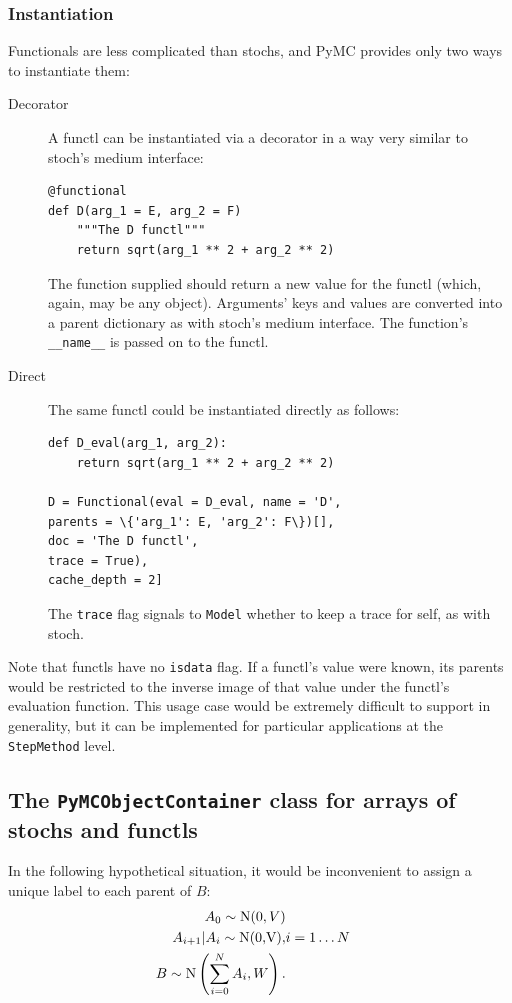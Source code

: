 \documentclass[]{book}
\begin{document}
\subsubsection{Instantiation}
Functionals are less complicated than stochs, and PyMC provides only two ways to instantiate them:
\begin{description}
    \item[Decorator] A functl can be instantiated via a decorator in a way very similar to stoch's medium interface:
\begin{verbatim}
@functional
def D(arg_1 = E, arg_2 = F)
    """The D functl"""
    return sqrt(arg_1 ** 2 + arg_2 ** 2)
\end{verbatim}
The function supplied should return a new value for the functl (which, again, may be any object). Arguments' keys and values are converted into a parent dictionary as with stoch's medium interface. The function's \texttt{\_\_name\_\_} is passed on to the functl.
    \item[Direct] The same functl could be instantiated directly as follows:
\begin{verbatim}
def D_eval(arg_1, arg_2):
    return sqrt(arg_1 ** 2 + arg_2 ** 2)

D = Functional(eval = D_eval, name = 'D',
parents = \{'arg_1': E, 'arg_2': F\})[],
doc = 'The D functl',
trace = True),
cache_depth = 2]
\end{verbatim}
The \texttt{trace} flag signals to \texttt{Model} whether to keep a trace for self, as with stoch.
\end{description}
Note that functls have no \texttt{isdata} flag. If a functl's value were known, its parents would be restricted to the inverse image of that value under the functl's evaluation function. This usage case would be extremely difficult to support in generality, but it can be implemented for particular applications at the \texttt{StepMethod} level.

\subsection{The \texttt{PyMCObjectContainer} class for arrays of stochs and functls}\label{sub:container}
In the following hypothetical situation, it would be inconvenient to assign a unique label to each parent of $B$:
\begin{eqnarray*}
	A_0 \sim \textup N(0,V)\\
	A_{i+1}|A_i\sim\textup{N(0,V)},&i=1\ldots N\\
	B \sim \textup N\left(\sum_{i=0}^N A_i,W\right).
\end{eqnarray*}
\end{document}
